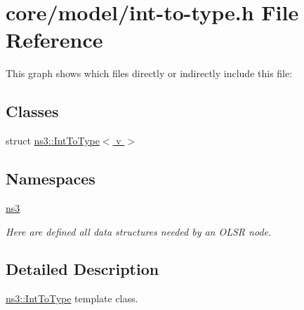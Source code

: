\hypertarget{int-to-type_8h}{}\section{core/model/int-\/to-\/type.h File Reference}
\label{int-to-type_8h}
This graph shows which files directly or indirectly include this file\+:
\subsection*{Classes}
\begin{DoxyCompactItemize}
\item 
struct \hyperlink{structns3_1_1IntToType}{ns3\+::\+Int\+To\+Type$<$ v $>$}
\end{DoxyCompactItemize}
\subsection*{Namespaces}
\begin{DoxyCompactItemize}
\item 
 \hyperlink{namespacens3}{ns3}
\begin{DoxyCompactList}\small\item\em Here are defined all data structures needed by an O\+L\+SR node. \end{DoxyCompactList}\end{DoxyCompactItemize}


\subsection{Detailed Description}
\hyperlink{structns3_1_1IntToType}{ns3\+::\+Int\+To\+Type} template class. 